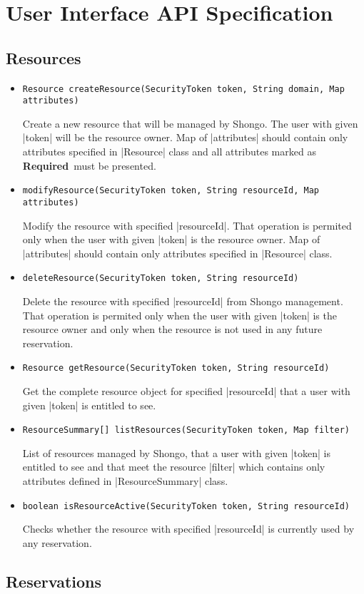 \documentclass[a4paper]{report}
\newenvironment{Api}{\begin{itemize}}{\end{itemize}}
\newcommand{\ApiCode}[1]{\lstinline[style=styleApi]|#1|}
\newcommand{\ApiItem}[1]{\item #1 %

}
\newcommand{\ApiCmd}[1]{\ApiItem{\ApiCode{#1}}}
\newcommand{\ApiRequired}{{\color{blue!50!black}\textbf{Required}}}
\begin{document}
\chapter{User Interface API Specification}

\section{Resources}

\begin{Api}

\ApiCmd{Resource createResource(SecurityToken token, String domain, Map attributes)}
Create a new resource that will be managed by Shongo. The user with given |token| will be the resource owner. Map of |attributes| should contain only attributes specified in |Resource| class and all attributes marked as \ApiRequired\ must be presented.

\ApiCmd{modifyResource(SecurityToken token, String resourceId, Map attributes)}
Modify the resource with specified |resourceId|. That operation is permited only when the user with given |token| is the resource owner. Map of |attributes| should contain only attributes specified in |Resource| class.

\ApiCmd{deleteResource(SecurityToken token, String resourceId)}
Delete the resource with specified |resourceId| from Shongo management. That operation is permited only when the user with given |token| is the resource owner and only when the resource is not used in any future reservation.

\ApiCmd{Resource getResource(SecurityToken token, String resourceId)}
Get the complete resource object for specified |resourceId| that a user with given |token| is entitled to see.

\ApiCmd{ResourceSummary[] listResources(SecurityToken token, Map filter)}
List of resources managed by Shongo, that a user with given |token| is entitled to see and that meet the resource |filter| which contains only attributes defined in |ResourceSummary| class.

\ApiCmd{boolean isResourceActive(SecurityToken token, String resourceId)}
Checks whether the resource with specified |resourceId| is currently used by any reservation.

\end{Api}


\section{Reservations}
\end{document}
